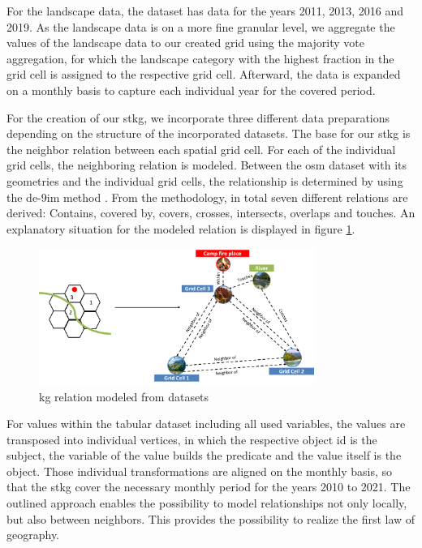\documentclass[
]{ceurart}
\begin{document}
For the landscape data, the dataset has data for the years 2011, 2013, 2016 and 2019. As the landscape data is on a more fine granular level, we aggregate the values of the landscape data to our created grid using the majority vote aggregation, for which the landscape category with the highest fraction in the grid cell is assigned to the respective grid cell. Afterward, the data is expanded on a monthly basis to capture each individual year for the covered period.

For the creation of our \gls*{stkg}, we incorporate three different data preparations depending on the structure of the incorporated datasets. The base for our \gls*{stkg} is the neighbor relation between each spatial grid cell. For each of the individual grid cells, the neighboring relation is modeled. Between the \gls*{osm} dataset with its geometries and the individual grid cells, the relationship is determined by using the \gls*{de-9im} method \cite{Clementini.1993}. From the methodology, in total seven different relations are derived: Contains, covered by, covers, crosses, intersects, overlaps and touches. An explanatory situation for the modeled relation is displayed in figure \ref{fig:RelationKG}.

\begin{figure}[t]
	\centering
	\includegraphics[width = 0.8\textwidth]{img/RelationGrid.png}
	\caption{\gls*{kg} relation modeled from datasets}
	\label{fig:RelationKG}
\end{figure}

For values within the tabular dataset including all used variables, the values are transposed into individual vertices, in which the respective object \gls*{id} is the subject, the variable of the value builds the predicate and the value itself is the object. Those individual transformations are aligned on the monthly basis, so that the \gls*{stkg} cover the necessary monthly period for the years 2010 to 2021. The outlined approach enables the possibility to model relationships not only locally, but also between neighbors. This provides the possibility to realize the first law of geography.
\end{document}
